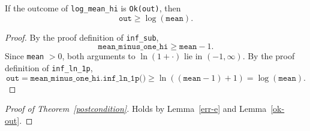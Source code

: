 \documentclass{article}
\begin{document}
\begin{lemma}
\label{ok-out}
If the outcome of \texttt{log\_mean\_hi} is \texttt{Ok(out)}, then
\[
\texttt{out} \ge \log(\texttt{mean}).
\]
\end{lemma}

\begin{proof}
By the proof definition of \texttt{inf\_sub},
\[
\texttt{mean\_minus\_one\_hi} \ge \texttt{mean} - 1.
\]
Since \texttt{mean} $> 0$, both arguments to $\ln(1+\cdot)$ lie in $(-1,\infty)$.
By the proof definition of \texttt{inf\_ln\_1p},
\[
\texttt{out}
=
\texttt{mean\_minus\_one\_hi.inf\_ln\_1p()}
\ge
\ln((\texttt{mean} - 1) + 1)
= \log(\texttt{mean}).
\]
\end{proof}

\begin{proof}[Proof of Theorem~\ref{postcondition}]
Holds by Lemma~\ref{err-e} and Lemma~\ref{ok-out}.
\end{proof}
\end{document}

